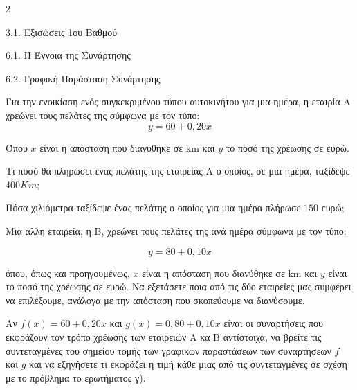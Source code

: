 \begin{ylh}{2}
    \item 3.1. Εξισώσεις 1ου Βαθμού
    \item 6.1. Η Έννοια της Συνάρτησης
    \item 6.2. Γραφική Παράσταση Συνάρτησης
\end{ylh}
Για την ενοικίαση ενός συγκεκριμένου τύπου αυτοκινήτου για μια ημέρα, η εταιρία Α χρεώνει τους πελάτες της σύμφωνα με τον τύπο:
\begin{equation*}y = 60 + 0,20x\end{equation*}

Όπου $x$ είναι η απόσταση που διανύθηκε σε km και $y$ το ποσό της χρέωσης σε ευρώ.

\begin{alist}
\item Τι ποσό θα πληρώσει ένας πελάτης της εταιρείας Α ο οποίος, σε μια ημέρα, ταξίδεψε $400Km$;
\item Πόσα χιλιόμετρα ταξίδεψε ένας πελάτης ο οποίος για μια ημέρα πλήρωσε $150$ ευρώ;
\item Μια άλλη εταιρεία, η Β, χρεώνει τους πελάτες της ανά ημέρα σύμφωνα με τον τύπο:

\begin{equation*}y = 80 + 0,10x\end{equation*}

όπου, όπως και προηγουμένως, $x$ είναι η απόσταση που διανύθηκε σε km και $y$ είναι το ποσό της χρέωσης σε ευρώ. Να εξετάσετε ποια από τις δύο εταιρείες μας συμφέρει να επιλέξουμε, ανάλογα με την απόσταση που σκοπεύουμε να διανύσουμε.
\item Αν $f(x) = 60 + 0,20x$ και $g(x) = 0,80 + 0,10x$ είναι οι συναρτήσεις που εκφράζουν τον τρόπο χρέωσης των εταιρειών Α κα Β αντίστοιχα, να βρείτε τις συντεταγμένες του σημείου τομής των γραφικών παραστάσεων των συναρτήσεων $f$ και $g$ και να εξηγήσετε τι εκφράζει η τιμή κάθε μιας από τις συντεταγμένες σε σχέση με το πρόβλημα το ερωτήματος γ).

\end{alist}

